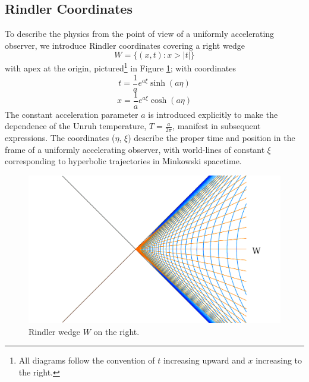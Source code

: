 \documentclass[12pt,a4paper]{article}
\begin{document}
\subsection{Rindler Coordinates}

To describe the physics from the point of view of a uniformly accelerating observer, we introduce Rindler coordinates \cite{frodden2018unruh,rindler1966kruskal} covering a right wedge 
\begin{equation}
  W = \{(x,t) : x>|t|\}
\end{equation}
with apex at the origin, pictured\footnote{All diagrams follow the convention of $t$ increasing upward and $x$ increasing to the right.} in Figure \ref{rindlerw}; with coordinates
\begin{equation}
  t = \frac{1}{a}e^{a\xi}\sinh{(a\eta)}
\label{sinh}
\end{equation}
\begin{equation}
x = \frac{1}{a}e^{a\xi}\cosh{(a\eta)}
\end{equation}
The constant acceleration parameter $a$ is introduced explicitly to make the dependence of the Unruh temperature, $T = \frac{a}{2\pi}$, manifest in subsequent expressions. The coordinates ($\eta$, $\xi$) describe the proper time and position in the frame of a uniformly accelerating observer, with world-lines of constant $\xi$ corresponding to hyperbolic trajectories in Minkowski spacetime.

\begin{figure}[h]
\centering
\includegraphics[scale=0.2]{rindler_w.png}
\caption{Rindler wedge $W$ on the right.}
\label{rindlerw}
\end{figure}
\end{document}
